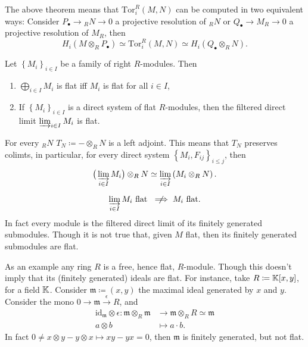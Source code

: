 \begin{rem}[Consequence]
	The above theorem means that $\mathrm{Tor}_i^R(M,N)$ can be computed in two equivalent ways:
	Consider $P_{\bullet} \to {}_RN \to 0$ a projective resolution of ${}_RN$
	or $Q_{\bullet} \to M_R \to 0$ a projective resolution of $M_R$, then
	\begin{equation}
		H_i \left( M \otimes_R P_{\bullet} \right) \simeq
		\mathrm{Tor}_i^R (M,N) \simeq
		H_i \left( Q_{\bullet} \otimes_R N \right)
	.\end{equation} 
\end{rem}

\begin{prop}
	Let $\left\{ M_i \right\}_{i \in I}$ be a family of right $R$-modules.
	Then
	\begin{enumerate}
		\item $\bigoplus_{i \in I} M_i$ is flat iff $M_i$ is flat for all $i \in I$,
		\item If $\left\{ M_i \right\}_{i \in I}$ is a direct system of flat $R$-modules, 
			then the filtered direct limit $\varinjlim_{i \in I} M_i$ is flat.
	\end{enumerate}
\end{prop} 

\begin{rem}[]
	For every ${}_RN$ $T_N \coloneqq - \otimes_R N$ is a left adjoint.
	This means that $T_N$ preserves colimts, 
	in particular, for every direct system $\left\{ M_i, F_{ij} \right\}_{i \leq j}$, then
	\begin{equation}
		\big( \varinjlim_{i \in I} M_i \big) \otimes_R N \simeq
		\varinjlim_{i \in I} \left( M_i \otimes_R N \right)
	.\end{equation} 
\end{rem}

\begin{rem}[]
	\begin{equation}
	\varinjlim_{i \in I} M_i \text{ flat } \centernot\implies M_i \text{ flat}
	.\end{equation} 
	In fact every module is the filtered direct limit of its finitely generated
	submodules.
	Though it is not true that, given $M$ flat, then its finitely generated submodules are flat.

	As an example any ring $R$ is a free, hence flat, $R$-module.
	Though this doesn't imply that its (finitely generated) ideals are flat.
	For instance, take $R \coloneqq \mathbb{K}[x,y]$, for a field $\mathbb{K}$.
	Consider $\mathfrak{m} \coloneqq (x,y)$ the maximal ideal generated by $x$ and $y$.
	Consider the mono $0 \to \mathfrak{m} \xrightarrow{\epsilon} R$, and
	\begin{align}
		\mathrm{id}_{ \mathfrak{m} } \otimes \epsilon\colon \mathfrak{m} \otimes_R \mathfrak{m} &\to 
		\mathfrak{m} \otimes_R R \simeq \mathfrak{m} \\
		a \otimes b &\mapsto a \cdot b
	.\end{align} 
	In fact $0 \neq x \otimes y - y \otimes x \mapsto xy - yx = 0$,
	then $\mathfrak{m}$ is finitely generated, but not flat.
\end{rem}

